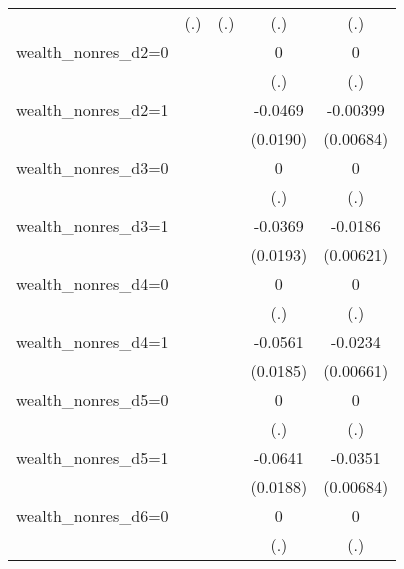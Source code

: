 \begin{table}[htbp]
\begin{tabular}{l*{4}{c}}
                &      (.)         &      (.)         &      (.)         &      (.)         \\
wealth\_nonres\_d2=0&                  &                  &        0         &        0         \\
                &                  &                  &      (.)         &      (.)         \\
wealth\_nonres\_d2=1&                  &                  &  -0.0469\sym{**} & -0.00399         \\
                &                  &                  & (0.0190)         &(0.00684)         \\
wealth\_nonres\_d3=0&                  &                  &        0         &        0         \\
                &                  &                  &      (.)         &      (.)         \\
wealth\_nonres\_d3=1&                  &                  &  -0.0369\sym{*}  &  -0.0186\sym{***}\\
                &                  &                  & (0.0193)         &(0.00621)         \\
wealth\_nonres\_d4=0&                  &                  &        0         &        0         \\
                &                  &                  &      (.)         &      (.)         \\
wealth\_nonres\_d4=1&                  &                  &  -0.0561\sym{***}&  -0.0234\sym{***}\\
                &                  &                  & (0.0185)         &(0.00661)         \\
wealth\_nonres\_d5=0&                  &                  &        0         &        0         \\
                &                  &                  &      (.)         &      (.)         \\
wealth\_nonres\_d5=1&                  &                  &  -0.0641\sym{***}&  -0.0351\sym{***}\\
                &                  &                  & (0.0188)         &(0.00684)         \\
wealth\_nonres\_d6=0&                  &                  &        0         &        0         \\
                &                  &                  &      (.)         &      (.)         \\

\end{tabular}
\end{table}
